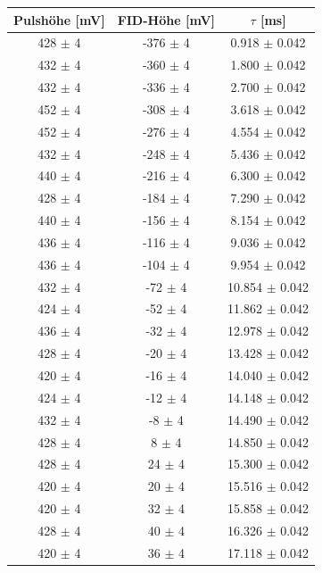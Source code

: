 \documentclass[12pt,a4paper]{article}
\begin{document}
\begin{table}
\centering
\begin{tabular}{|c|c|c|}
\hline 
Pulshöhe [mV] & FID-Höhe [mV] & $\tau$ [ms] \\ 
\hline 
428 $\pm$ 4 & -376 $\pm$ 4 & 0.918 $\pm$ 0.042 \\ 
\hline 
432 $\pm$ 4 & -360 $\pm$ 4 & 1.800 $\pm$ 0.042 \\ 
\hline 
432 $\pm$ 4 & -336 $\pm$ 4 & 2.700 $\pm$ 0.042 \\ 
\hline 
452 $\pm$ 4 & -308 $\pm$ 4 & 3.618 $\pm$ 0.042 \\ 
\hline 
452 $\pm$ 4 & -276 $\pm$ 4 & 4.554 $\pm$ 0.042 \\ 
\hline 
432 $\pm$ 4 & -248 $\pm$ 4 & 5.436 $\pm$ 0.042 \\ 
\hline 
440 $\pm$ 4 & -216 $\pm$ 4 & 6.300 $\pm$ 0.042 \\ 
\hline 
428 $\pm$ 4 & -184 $\pm$ 4 & 7.290 $\pm$ 0.042 \\ 
\hline 
440 $\pm$ 4 & -156 $\pm$ 4 & 8.154 $\pm$ 0.042 \\ 
\hline 
436 $\pm$ 4 & -116 $\pm$ 4 & 9.036 $\pm$ 0.042 \\ 
\hline 
436 $\pm$ 4 & -104 $\pm$ 4 & 9.954 $\pm$ 0.042 \\ 
\hline 
432 $\pm$ 4 & -72 $\pm$ 4 & 10.854 $\pm$ 0.042 \\ 
\hline 
424 $\pm$ 4 & -52 $\pm$ 4 & 11.862 $\pm$ 0.042 \\ 
\hline 
436 $\pm$ 4 & -32 $\pm$ 4 & 12.978 $\pm$ 0.042 \\ 
\hline 
428 $\pm$ 4 & -20 $\pm$ 4 & 13.428 $\pm$ 0.042 \\ 
\hline 
420 $\pm$ 4 & -16 $\pm$ 4 & 14.040 $\pm$ 0.042 \\ 
\hline 
424 $\pm$ 4 & -12 $\pm$ 4 & 14.148 $\pm$ 0.042 \\ 
\hline 
432 $\pm$ 4 & -8 $\pm$ 4 & 14.490 $\pm$ 0.042 \\ 
\hline 
428 $\pm$ 4 & 8 $\pm$ 4 & 14.850 $\pm$ 0.042 \\ 
\hline 
428 $\pm$ 4 & 24 $\pm$ 4 & 15.300 $\pm$ 0.042 \\ 
\hline 
420 $\pm$ 4 & 20 $\pm$ 4 & 15.516 $\pm$ 0.042 \\ 
\hline 
420 $\pm$ 4 & 32 $\pm$ 4 & 15.858 $\pm$ 0.042 \\ 
\hline 
428 $\pm$ 4 & 40 $\pm$ 4 & 16.326 $\pm$ 0.042 \\ 
\hline 
420 $\pm$ 4 & 36 $\pm$ 4 & 17.118 $\pm$ 0.042 \\ 
\hline 

\end{tabular}
\end{table}
\end{document}
